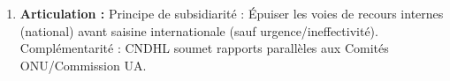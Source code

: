 \documentclass[11pt]{article}
\newcommand{\cle}[1]{{\popxbold\color{popdark}#1}}
\begin{document}
\begin{methode}
\begin{enumerate}
\begin{itemize}
                \item \cle{Juridictions :} Conseil Constitutionnel (constitutionnalité), Cour Suprême (admin/judiciaire), TPI/Cour d'Appel (droit commun).
                \item \cle{Autres :} Médiateur de la République (non créé formellement au Cameroun, fonctions proches assurées par CNDHL/SGPR), ONG agréées.
            \end{itemize}
        \item \textbf{Articulation :} Principe de \cle{subsidiarité} : Épuiser les voies de recours internes (national) avant saisine internationale (sauf urgence/ineffectivité). Complémentarité : CNDHL soumet rapports parallèles aux Comités ONU/Commission UA.
    \end{enumerate}
\end{methode}
\end{document}
